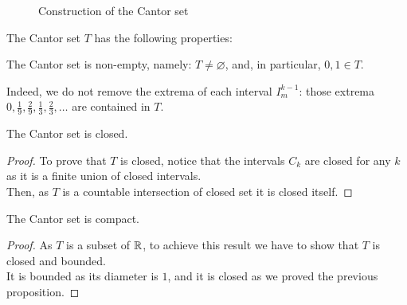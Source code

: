 \begin{figure}[H]
	\centering
	\caption*{Construction of the Cantor set} %
\end{figure}

The Cantor set $T$ has the following properties:
\begin{prop}\label{Cantor-set-non-empty}
	The Cantor set is non-empty, namely: $T \neq \varnothing$, and, in particular, $0, 1 \in T$.
\end{prop}
Indeed, we do not remove the extrema of each interval $I_m^{k-1}$: those extrema $0, \frac 1 9, \frac 2 9, \frac 1 3, \frac 2 3, \ldots$ are contained in $T$.

\begin{prop} \label{Cantor-set-closed}
	The Cantor set is closed.
\end{prop}
\begin{proof}
	To prove that $T$ is closed, notice that the intervals $C_k$ are closed for any $k$ as it is a finite union of closed intervals.\\
	Then, as $T$ is a countable intersection of closed set it is closed itself.
\end{proof}

\begin{prop}\label{Cantor-set-compact}
	The Cantor set is compact.
\end{prop}
\begin{proof}
	As $T$ is a subset of $\mathbb R$, to achieve this result we have to show that $T$ is closed and bounded.\\
	It is bounded as its diameter is $1$, and it is closed as we proved the previous proposition.
\end{proof}

